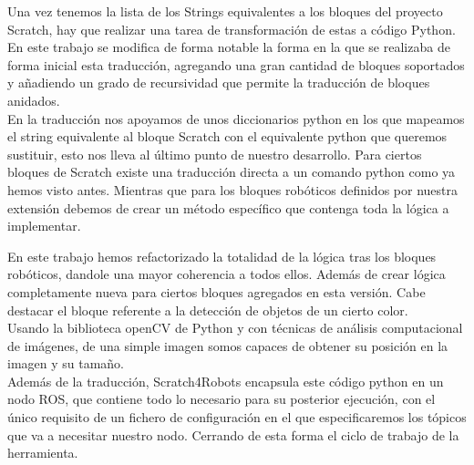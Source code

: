 Una vez tenemos la lista de los Strings equivalentes a los bloques del proyecto Scratch, hay que realizar una tarea de transformación de estas a código Python.\\

En este trabajo se modifica de forma notable la forma en la que se realizaba de forma inicial esta traducción, agregando una gran cantidad de bloques soportados y añadiendo un grado de recursividad que permite la traducción de bloques anidados.\\

En la traducción nos apoyamos de unos diccionarios python en los que mapeamos el string equivalente al bloque Scratch con el equivalente python que queremos sustituir, esto nos lleva al último punto de nuestro desarrollo. Para ciertos bloques de Scratch existe una traducción directa a un comando python como ya hemos visto antes. Mientras que para los bloques robóticos definidos por nuestra extensión debemos de crear un método específico que contenga toda la lógica a implementar.

En este trabajo hemos refactorizado la totalidad de la lógica tras los bloques robóticos, dandole una mayor coherencia a todos ellos. Además de crear lógica completamente nueva para ciertos bloques agregados en esta versión. Cabe destacar el bloque referente a la detección de objetos de un cierto color.\\

Usando la biblioteca openCV de Python y con técnicas de análisis computacional de imágenes, de una simple imagen somos capaces de obtener su posición en la imagen y su tamaño.\\

Además de la traducción, Scratch4Robots encapsula este código python en un nodo ROS, que contiene todo lo necesario para su posterior ejecución, con el único requisito de un fichero de configuración en el que especificaremos los tópicos que va a necesitar nuestro nodo. Cerrando de esta forma el ciclo de trabajo de la herramienta.\\
